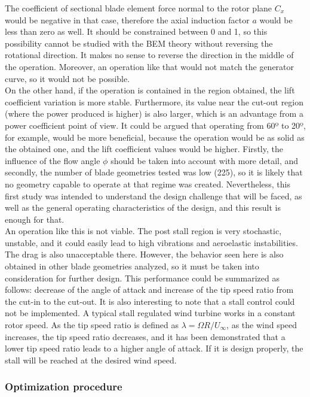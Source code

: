 \documentclass[../TFG_Report.tex]{subfiles}
\begin{document}
The coefficient of sectional blade element force normal to the rotor plane $C_x$ would be negative in that case, therefore the axial induction factor $a$ would be less than zero as well. It should be constrained between 0 and 1, so this possibility cannot be studied with the BEM theory without reversing the rotational direction. It makes no sense to reverse the direction in the middle of the operation. Moreover, an operation like that would not match the generator curve, so it would not be possible.   \\

On the other hand, if the operation is contained in the region obtained, the lift coefficient variation is more stable. Furthermore, its value near the cut-out region (where the power produced is higher) is also larger, which is an advantage from a power coefficient point of view. It could be argued that operating from 60º to 20º, for example, would be more beneficial, because the operation would be as solid as the obtained one, and the lift coefficient values would be higher. Firstly, the influence of the flow angle $\phi$ should be taken into account with more detail, and secondly, the number of blade geometries tested was low (225), so it is likely that no geometry capable to operate at that regime was created. Nevertheless, this first study was intended to understand the design challenge that will be faced, as well as the general operating characteristics of the design, and this result is enough for that. \\

An operation like this is not viable. The post stall region is very stochastic, unstable, and it could easily lead to high vibrations and aeroelastic instabilities. The drag is also unacceptable there. However, the behavior seen here is also obtained in other blade geometries analyzed, so it must be taken into consideration for further design. This performance could be summarized as follows: decrease of the angle of attack and increase of the tip speed ratio from the cut-in to the cut-out. It is also interesting to note that a stall control could not be implemented. A typical stall regulated wind turbine works in a constant rotor speed. As the tip speed ratio is defined as $\lambda = \Omega R / U_{\infty}$, as the wind speed increases, the tip speed ratio decreases, and it has been demonstrated that a lower tip speed ratio leads to a higher angle of attack. If it is design properly, the stall will be reached at the desired wind speed. 







\subsubsection{Optimization procedure}









	
	



	
\end{document}
